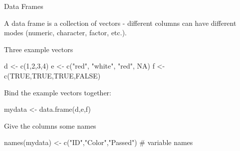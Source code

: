 \documentclass[
  10pt,
  ignorenonframetext,
]{beamer}
\newenvironment{Shaded}{\begin{snugshade}}{\end{snugshade}}
\newcommand{\CommentTok}[1]{\textcolor[rgb]{0.50,0.62,0.50}{#1}}
\newcommand{\DecValTok}[1]{\textcolor[rgb]{0.86,0.86,0.80}{#1}}
\newcommand{\KeywordTok}[1]{\textcolor[rgb]{0.94,0.87,0.69}{#1}}
\newcommand{\NormalTok}[1]{\textcolor[rgb]{0.80,0.80,0.80}{#1}}
\newcommand{\OtherTok}[1]{\textcolor[rgb]{0.94,0.94,0.56}{#1}}
\newcommand{\StringTok}[1]{\textcolor[rgb]{0.80,0.58,0.58}{#1}}
\begin{document}
\begin{frame}[fragile]{Data Frames}
\protect\hypertarget{data-frames}{}

A data frame is a collection of vectors - different columns can have
different modes (numeric, character, factor, etc.).

\begin{block}{Three example vectors}

\begin{Shaded}
\begin{Highlighting}[]
\NormalTok{d <-}\StringTok{ }\KeywordTok{c}\NormalTok{(}\DecValTok{1}\NormalTok{,}\DecValTok{2}\NormalTok{,}\DecValTok{3}\NormalTok{,}\DecValTok{4}\NormalTok{)}
\NormalTok{e <-}\StringTok{ }\KeywordTok{c}\NormalTok{(}\StringTok{"red"}\NormalTok{, }\StringTok{"white"}\NormalTok{, }\StringTok{"red"}\NormalTok{, }\OtherTok{NA}\NormalTok{)}
\NormalTok{f <-}\StringTok{ }\KeywordTok{c}\NormalTok{(}\OtherTok{TRUE}\NormalTok{,}\OtherTok{TRUE}\NormalTok{,}\OtherTok{TRUE}\NormalTok{,}\OtherTok{FALSE}\NormalTok{)}
\end{Highlighting}
\end{Shaded}

\end{block}

\begin{block}{Bind the example vectors together:}

\begin{Shaded}
\begin{Highlighting}[]
\NormalTok{mydata <-}\StringTok{ }\KeywordTok{data.frame}\NormalTok{(d,e,f)}
\end{Highlighting}
\end{Shaded}

\end{block}

\begin{block}{Give the columns some names}

\begin{Shaded}
\begin{Highlighting}[]
\KeywordTok{names}\NormalTok{(mydata) <-}\StringTok{ }\KeywordTok{c}\NormalTok{(}\StringTok{"ID"}\NormalTok{,}\StringTok{"Color"}\NormalTok{,}\StringTok{"Passed"}\NormalTok{) }\CommentTok{# variable names}
\end{Highlighting}
\end{Shaded}

\end{block}

\end{frame}
\end{document}
